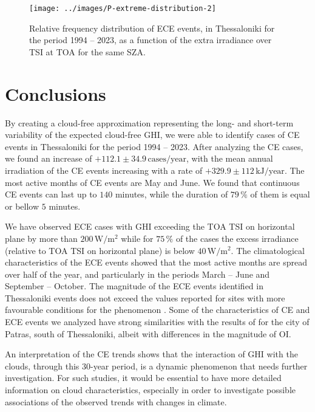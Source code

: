 \documentclass[preprint, 5p,
authoryear]{elsarticle} %
\begin{document}
\begin{figure}

{\centering \texttt{[image: ../images/P-extreme-distribution-2]} 

}

\caption{Relative frequency distribution of ECE events, in Thessaloniki for the period 1994 -- 2023, as a function of the extra irradiance over TSI at TOA for the same SZA.}\label{fig:P-extreme-distribution}
\end{figure}

\hypertarget{conclusions}{%
\section{Conclusions}\label{conclusions}}

By creating a cloud-free approximation representing the long- and
short-term variability of the expected cloud-free GHI, we were able to
identify cases of CE events in Thessaloniki for the period 1994 -- 2023.
After analyzing the CE cases, we found an increase of
\(+112.1\pm 34.9\,\text{cases}/\text{year}\), with the mean annual
irradiation of the CE events increasing with a rate of
\(+329.9\pm 112\,\text{kJ}/\text{year}\). The most active months of CE
events are May and June. We found that continuous CE events can last up
to \(140\) minutes, while the duration of \(79\,\%\) of them is equal or
bellow \(5\) minutes.

We have observed ECE cases with GHI exceeding the TOA TSI on horizontal
plane by more than \(200\,\text{W}/\text{m}^{2}\) while for \(75\,\%\)
of the cases the excess irradiance (relative to TOA TSI on horizontal
plane) is below \(40\,\text{W}/\text{m}^{2}\). The climatological
characteristics of the ECE events showed that the most active months are
spread over half of the year, and particularly in the periods March --
June and September -- October. The magnitude of the ECE events
identified in Thessaloniki events does not exceed the values reported
for sites with more favourable conditions for the phenomenon
\citep[e.g.,][]{Cordero2023}. Some of the characteristics of CE and ECE
events we analyzed have strong similarities with the results of
\citet{Vamvakas2020} for the city of Patras, south of Thessaloniki,
albeit with differences in the magnitude of OI.

An interpretation of the CE trends shows that the interaction of GHI
with the clouds, through this 30-year period, is a dynamic phenomenon
that needs further investigation. For such studies, it would be
essential to have more detailed information on cloud characteristics,
especially in order to investigate possible associations of the observed
trends with changes in climate.


\end{document}
